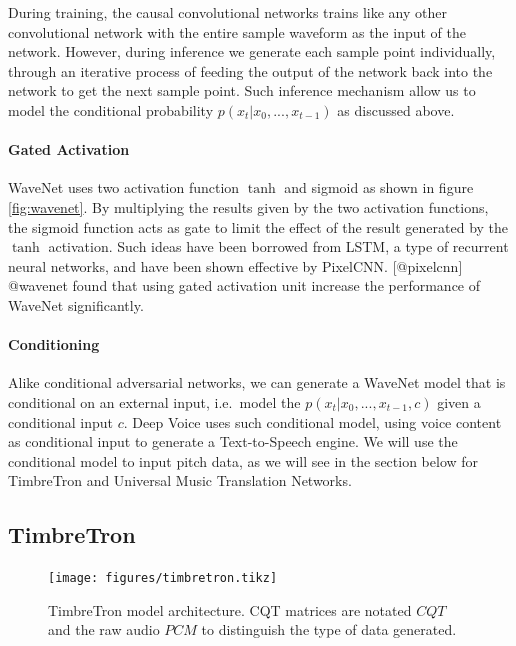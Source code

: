 \documentclass[12pt,a4paper,]{report}
\begin{document}
During training, the causal convolutional networks trains like any other
convolutional network with the entire sample waveform as the input of
the network. However, during inference we generate each sample point
individually, through an iterative process of feeding the output of the
network back into the network to get the next sample point. Such
inference mechanism allow us to model the conditional probability
\(p(x_t | x_0, ..., x_{t-1})\) as discussed above.

\paragraph{Gated Activation}

WaveNet uses two activation function \(\tanh\) and sigmoid as shown in
figure \ref{fig:wavenet}. By multiplying the results given by the two
activation functions, the sigmoid function acts as gate to limit the
effect of the result generated by the \(\tanh\) activation. Such ideas
have been borrowed from LSTM, a type of recurrent neural networks, and
have been shown effective by PixelCNN. {[}@pixelcnn{]} @wavenet found
that using gated activation unit increase the performance of WaveNet
significantly.

\paragraph{Conditioning}

Alike conditional adversarial networks, we can generate a WaveNet model
that is conditional on an external input, i.e.~model the
\(p(x_t | x_0, ..., x_{t-1}, c)\) given a conditional input \(c\). Deep
Voice uses such conditional model, using voice content as conditional
input to generate a Text-to-Speech engine. We will use the conditional
model to input pitch data, as we will see in the section below for
TimbreTron and Universal Music Translation Networks.

\hypertarget{timbretron}{%
\subsection{TimbreTron}\label{timbretron}}

\begin{figure}[h]
    \texttt{[image: figures/timbretron.tikz]}
    \centering
    \caption{TimbreTron model architecture. CQT matrices are notated $CQT$ and the raw audio $PCM$ to distinguish the type of data generated.} \label{fig:timbretron}
\end{figure}
\end{document}
